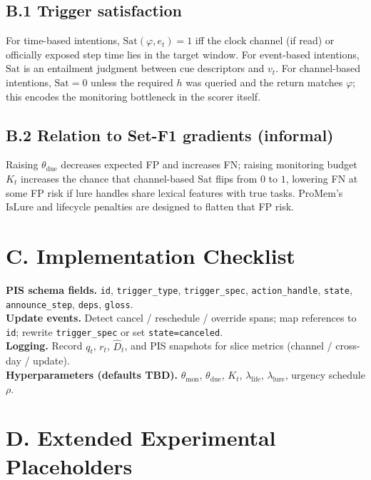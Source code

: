 \subsection{B.1 Trigger satisfaction}
For time-based intentions, $\mathrm{Sat}(\varphi,e_t)=1$ iff the clock channel (if read) or officially exposed step time lies in the target window. For event-based intentions, $\mathrm{Sat}$ is an entailment judgment between cue descriptors and $v_t$. For channel-based intentions, $\mathrm{Sat}=0$ unless the required $h$ was queried and the return matches $\varphi$; this encodes the monitoring bottleneck in the scorer itself.

\subsection{B.2 Relation to Set-F1 gradients (informal)}
Raising $\theta_{\mathrm{due}}$ decreases expected FP and increases FN; raising monitoring budget $K_t$ increases the chance that channel-based $\mathrm{Sat}$ flips from $0$ to $1$, lowering FN at some FP risk if lure handles share lexical features with true tasks. ProMem's $\mathrm{IsLure}$ and lifecycle penalties are designed to flatten that FP risk.

\section{C. Implementation Checklist}
\label{sec:impl-checklist}

\noindent\textbf{PIS schema fields.} \texttt{id}, \texttt{trigger\_type}, \texttt{trigger\_spec}, \texttt{action\_handle}, \texttt{state}, \texttt{announce\_step}, \texttt{deps}, \texttt{gloss}.\\
\noindent\textbf{Update events.} Detect cancel / reschedule / override spans; map references to \texttt{id}; rewrite \texttt{trigger\_spec} or set \texttt{state=canceled}.\\
\noindent\textbf{Logging.} Record $q_t$, $r_t$, $\hat{D}_t$, and PIS snapshots for slice metrics (channel / cross-day / update).\\
\noindent\textbf{Hyperparameters (defaults TBD).} $\theta_{\mathrm{mon}}$, $\theta_{\mathrm{due}}$, $K_t$, $\lambda_{\mathrm{life}}$, $\lambda_{\mathrm{lure}}$, urgency schedule $\rho$.

\section{D. Extended Experimental Placeholders}
\label{sec:ext-exp}

